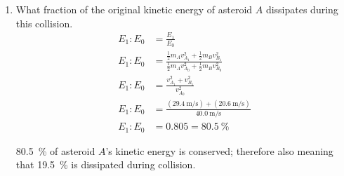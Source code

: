 \documentclass{article}
\begin{document}
\begin{enumerate}[label = \textbf{(\alph*)}]
\begin{align*}
			\matr{A}_2 & = \matr{A}_2 - \matr{A}_1 \frac{\sqrt{3}}{3} \\
			\left[ \matr{A} | \vect{v} \right] & =
				\left[ \begin{array}{ c c | c }
					\cos(\SI{30.0}{\degree}) & \cos(\SI{-45.0}{\degree}) & \SI{40.0}{\meter \per \second} \\
					0 & -1.12 & \SI{-23.1}{\meter \per \second}
			\end{array} \right]
		\end{align*}
		\begin{align*}
			-1.12 \vect{v}_B & = \SI{-23.1}{\meter \per \second} \\
			\vect{v}_B & = \SI{20.6}{\meter \per \second}
		\end{align*}
		\begin{align*}
			(\cos(\SI{30.0}{\degree}))\vect{v}_A + (\cos(\SI{-45.0}{\degree}))\vect{v}_B & = \SI{40.0}{\meter \per \second} \\
			(\cos(\SI{30.0}{\degree}))\vect{v}_A + (\cos(\SI{-45.0}{\degree}))(\SI{20.6}{\meter \per \second}) & = \SI{40.0}{\meter \per \second} \\
			\vect{v}_A & = \SI{29.4}{\meter \per \second}
		\end{align*}
		\begin{mdframed}
			Asteroid $ A $ moves \SI{29.4}{\meter \per \second} at \SI{30.0}{\degree} above the horizontal while asteroid $ B $ moves \SI{20.6}{\meter \per \second} at \SI{-45.0}{\degree} below the horizontal.
		\end{mdframed}
	\item What fraction of the original kinetic energy of asteroid $ A $ dissipates during this collision.
		\begin{align*}
			E_1 : E_0 & = \frac{E_1}{E_0} \\
			E_1 : E_0 & = \frac{ \frac{1}{2}m_Av_{A_1}^2 + \frac{1}{2}m_Bv_{B_1}^2 }{ \frac{1}{2}m_Av_{A_0}^2 + \frac{1}{2}m_Bv_{B_0}^2 } \\
			E_1 : E_0 & = \frac{ v_{A_1}^2 + v_{B_1}^2 }{ v_{A_0}^2 } \\
			E_1 : E_0 & = \frac{ (\SI{29.4}{\meter \per \second}) + (\SI{20.6}{\meter \per \second}) }{ \SI{40.0}{\meter \per \second} } \\
			E_1 : E_0 & = 0.805 = \SI{80.5}{\percent}
		\end{align*}
		\begin{mdframed}
			\SI{80.5}{\percent} of asteroid $ A $'s kinetic energy is conserved; therefore also meaning that \SI{19.5}{\percent} is dissipated during collision.
		\end{mdframed}
\end{enumerate}
\end{document}
